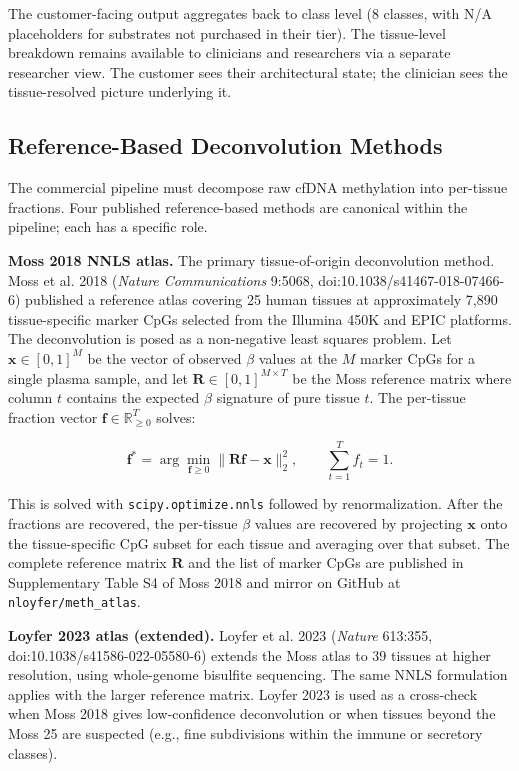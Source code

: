 \documentclass[12pt,a4paper]{article}
\begin{document}
The customer-facing output aggregates back to class level (8 classes,
with N/A placeholders for substrates not purchased in their tier).
The tissue-level breakdown remains available to clinicians and
researchers via a separate researcher view. The customer sees their
architectural state; the clinician sees the tissue-resolved picture
underlying it.

\subsection{Reference-Based Deconvolution Methods}
\label{subsec:deconvolution}

The commercial pipeline must decompose raw cfDNA methylation into
per-tissue fractions. Four published reference-based methods are
canonical within the pipeline; each has a specific role.

\textbf{Moss 2018 NNLS atlas.} The primary tissue-of-origin
deconvolution method. Moss et al. 2018 (\textit{Nature Communications}
9:5068, doi:10.1038/s41467-018-07466-6) published a reference atlas
covering 25 human tissues at approximately 7{,}890 tissue-specific
marker CpGs selected from the Illumina 450K and EPIC platforms. The
deconvolution is posed as a non-negative least squares problem. Let
$\mathbf{x} \in [0,1]^M$ be the vector of observed $\beta$ values at
the $M$ marker CpGs for a single plasma sample, and let
$\mathbf{R} \in [0,1]^{M \times T}$ be the Moss reference matrix
where column $t$ contains the expected $\beta$ signature of pure
tissue $t$. The per-tissue fraction vector
$\mathbf{f} \in \mathbb{R}_{\geq 0}^T$ solves:

\begin{equation}
\mathbf{f}^* = \arg\min_{\mathbf{f} \geq 0} \|\mathbf{R}\mathbf{f} - \mathbf{x}\|_2^2,
\qquad \sum_{t=1}^{T} f_t = 1.
\label{eq:moss_nnls}
\end{equation}

This is solved with \texttt{scipy.optimize.nnls} followed by
renormalization. After the fractions are recovered, the per-tissue
$\beta$ values are recovered by projecting $\mathbf{x}$ onto the
tissue-specific CpG subset for each tissue and averaging over that
subset. The complete reference matrix $\mathbf{R}$ and the list of
marker CpGs are published in Supplementary Table S4 of Moss 2018 and
mirror on GitHub at \texttt{nloyfer/meth\_atlas}.

\textbf{Loyfer 2023 atlas (extended).} Loyfer et al. 2023
(\textit{Nature} 613:355, doi:10.1038/s41586-022-05580-6) extends the
Moss atlas to 39 tissues at higher resolution, using whole-genome
bisulfite sequencing. The same NNLS formulation applies with the
larger reference matrix. Loyfer 2023 is used as a cross-check when
Moss 2018 gives low-confidence deconvolution or when tissues beyond
the Moss 25 are suspected (e.g., fine subdivisions within the immune
or secretory classes).
\end{document}

